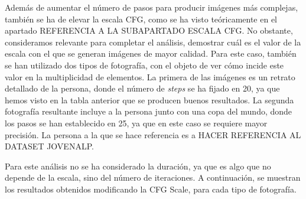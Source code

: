 Además de aumentar el número de pasos para producir imágenes más complejas, también se ha de elevar la escala CFG, como se ha visto teóricamente en el apartado REFERENCIA A LA SUBAPARTADO ESCALA CFG. No obstante, consideramos relevante para completar el análisis, demostrar cuál es el valor de la escala con el que se generan imágenes de mayor calidad. Para este caso, también se han utilizado dos tipos de fotografía, con el objeto de ver cómo incide este valor en la multiplicidad de elementos. La primera de las imágenes es un retrato detallado de la persona, donde el número de \textit{steps} se ha fijado en 20, ya que hemos visto en la tabla anterior que se producen buenos resultados. La segunda fotografía resultante incluye a la persona junto con una copa del mundo, donde los pasos se han establecido en 25, ya que en este caso se requiere mayor precisión. La persona a la que se hace referencia es a HACER REFERENCIA AL DATASET JOVENALP.

Para este análisis no se ha considerado la duración, ya que es algo que no depende de la escala, sino del número de iteraciones. A continuación, se muestran los resultados obtenidos modificando la CFG Scale, para cada tipo de fotografía.

